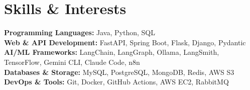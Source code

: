 \documentclass[letterpaper,11pt]{article}
\begin{document}
\section{Skills \& Interests}
\begin{itemize}[leftmargin=0.15in, label={}]
  \small{
    \item{
      \textbf{Programming Languages:} Java, Python, SQL \\
      \textbf{Web \& API Development:} FastAPI, Spring Boot, Flask, Django, Pydantic \\
      \textbf{AI/ML Frameworks:} LangChain, LangGraph, Ollama, LangSmith, TensorFlow, Gemini CLI, Claude Code, n8n \\
      \textbf{Databases \& Storage:} MySQL, PostgreSQL, MongoDB, Redis, AWS S3 \\
      \textbf{DevOps \& Tools:} Git, Docker, GitHub Actions, AWS EC2, RabbitMQ
    }
  }
\end{itemize}
\end{document}
